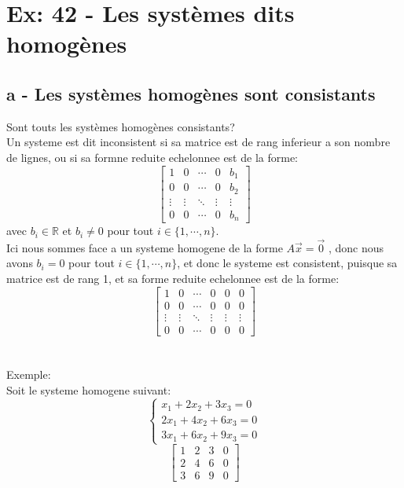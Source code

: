 \documentclass{config/homework}
\begin{document}
    \section{Ex: 42 - Les systèmes dits homogènes}\label{sec:section}

    \subsection{a - Les systèmes homogènes sont consistants}\label{subsec:a}
    Sont touts les systèmes homogènes consistants? \\

    Un systeme est dit inconsistent si sa matrice est de rang inferieur a son nombre de lignes, ou
    si sa formne reduite echelonnee est de la forme:
    \[
        \left[
            \begin{array}{rrrr|r}
                1 & 0 & \cdots & 0 & b_{1} \\
                0 & 0 & \cdots & 0 & b_{2} \\
                \vdots & \vdots & \ddots & \vdots & \vdots \\
                0 & 0 & \cdots & 0 & b_{n}
            \end{array}
            \right]
    \]
    avec $b_i \in \mathbb{R}$ et $b_i \neq 0$ pour tout $i \in \{1, \cdots, n\}$.\\
    Ici nous sommes face a un systeme homogene de la forme $A\vec{x}=\vec{0}$ , donc nous avons $b_i = 0$
    pour tout $i \in \{1, \cdots, n\}$, et donc le systeme est consistent, puisque sa matrice est de rang 1,
    et sa forme reduite echelonnee est de la forme:
    \[
        \left[
            \begin{array}{rrrrr|r}
                1 & 0 & \cdots & 0 & 0 & 0 \\
                0 & 0 & \cdots & 0 & 0 & 0 \\
                \vdots & \vdots & \ddots & \vdots & \vdots & \vdots \\
                0 & 0 & \cdots & 0 & 0 & 0
            \end{array}
        \right]
    \]
    \noindent{}
    \\ \\
    Exemple:\\
    Soit le systeme homogene suivant:
    \[
        \begin{cases}
            x_1 + 2x_2 + 3x_3 = 0 \\
            2x_1 + 4x_2 + 6x_3 = 0 \\
            3x_1 + 6x_2 + 9x_3 = 0
        \end{cases}
    \]
    \[
        \left[
            \begin{array}{rrr|r}
                1 & 2 & 3 & 0 \\
                2 & 4 & 6 & 0 \\
                3 & 6 & 9 & 0
            \end{array}
        \right]
    \]
\end{document}
